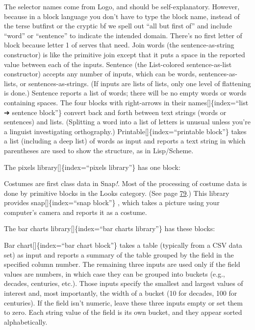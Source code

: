 \documentclass[
  letterpaper,
]{book}
\begin{document}
The selector names come from Logo, and should be self-explanatory.
However, because in a block language you don't have to type the block
name, instead of the terse butfirst or the cryptic bf we spell out ``all
but first of'' and include ``word'' or ``sentence'' to indicate the
intended domain. There's no first letter of block because letter 1 of
serves that need. Join words (the sentence-as-string constructor) is
like the primitive join except that it puts a space in the reported
value between each of the inputs. Sentence (the List-colored
sentence-as-list constructor) accepts any number of inputs, which can be
words, sentences-as-lists, or sentences-as-strings. (If inputs are lists
of lists, only one level of flattening is done.) Sentence reports a list
of words; there will be no empty words or words containing spaces. The
four blocks with right-arrows in their names{[}{]}\{index=``list ➔
sentence block''\} convert back and forth between text strings (words or
sentences) and lists. (Splitting a word into a list of letters is
unusual unless you're a linguist investigating orthography.)
Printable{[}{]}\{index=``printable block''\} takes a list (including a
deep list) of words as input and reports a text string in which
parentheses are used to show the structure, as in Lisp/Scheme.

The pixels library{[}{]}\{index=``pixels library''\} has one block:

Costumes are first class data in Snap\emph{!}. Most of the processing of
costume data is done by primitive blocks in the Looks category. (See
page \hyperref[media-computation-with-costumes]{79}.) This library
provides snap{[}{]}\{index=``snap block''\} , which takes a picture
using your computer's camera and reports it as a costume.

The bar charts library{[}{]}\{index=``bar charts library''\} has these
blocks:

Bar chart{[}{]}\{index=``bar chart block''\} takes a table (typically
from a CSV data set) as input and reports a summary of the table grouped
by the field in the specified column number. The remaining three inputs
are used only if the field values are numbers, in which case they can be
grouped into buckets (e.g., decades, centuries, etc.). Those inputs
specify the smallest and largest values of interest and, most
importantly, the width of a bucket (10 for decades, 100 for centuries).
If the field isn't numeric, leave these three inputs empty or set them
to zero. Each string value of the field is its own bucket, and they
appear sorted alphabetically.
\end{document}

